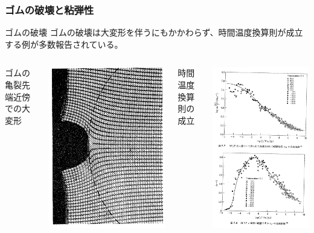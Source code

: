 \documentclass[11pt, dvipdfmx]{beamer}
\begin{document}
\begin{frame}
\frametitle{ゴムの破壊と粘弾性}

\begin{block}{ゴムの破壊}
ゴムの破壊は大変形を伴うにもかかわらず、時間温度換算則が成立する例が多数報告されている。
\end{block}



\begin{columns}[totalwidth=1\textwidth]

ゴムの亀裂先端近傍での大変形

\centering
\includegraphics[width=.6\textwidth]{./fig/rubber_crack.png}


時間温度換算則の成立

\centering
\includegraphics[width=.5\textwidth]{./fig/Time_Temp.png}
\end{columns}

\end{frame}
\end{document}

